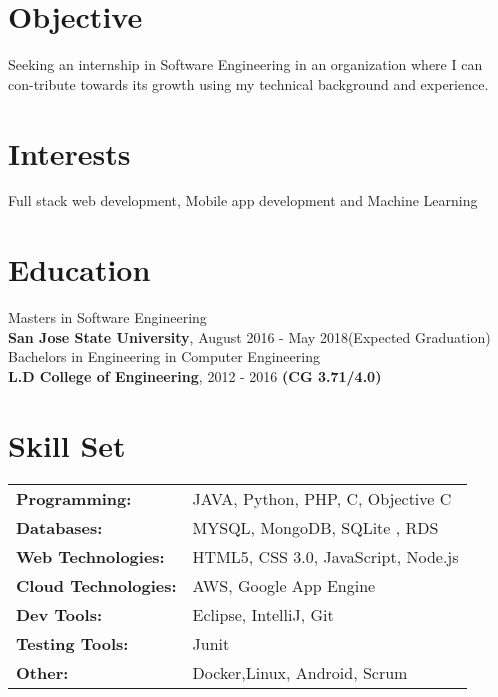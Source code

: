 \documentclass[margin]{res}
\begin{document}

\address{ \textbf{Phone}:\hspace{1mm}\href{+1-669-251-5680}{+1-669-251-5680}\hspace{5mm} \textbf{Github}:\hspace{1mm}\href{https://github.com/amiforgit}{amiforgit}\hspace{5mm}      \textbf{Email}:\hspace{1mm}\href{mailto:ami.patel317@gmail.com}{ami.patel317@gmail.com} }

\begin{resume}


\section{Objective }

  Seeking an internship in Software Engineering in an organization where I can con-tribute towards its growth using my technical background and experience.
  
\section{Interests}

  Full stack web development, Mobile app development and Machine Learning

\section{Education}
  Masters in Software Engineering \\
  \vspace{1.5mm}
  {\bf San Jose State University}, August 2016 - May 2018(Expected Graduation) \\ 
   Bachelors in Engineering in Computer Engineering \\
   \vspace{1.5mm}
  {\bf  L.D College of Engineering}, 2012 - 2016 {\bf (CG 3.71/4.0) } \\
  
\section{Skill Set}
   \begin{tabular}{l p{3in}}
    {\bf Programming:} & JAVA, Python, PHP, C, Objective C \\
    {\bf Databases:} & MYSQL, MongoDB, SQLite , RDS  \\
    {\bf Web Technologies:} &  HTML5, CSS 3.0, JavaScript, Node.js \\
    {\bf Cloud Technologies:} &  AWS, Google App Engine \\
    \bf {Dev Tools:} & Eclipse, IntelliJ, Git \\
    {\bf Testing Tools:} & Junit\\
    {\bf Other:} & Docker,Linux, Android, Scrum \\
     \end{tabular}


\end{resume}
\end{document}
